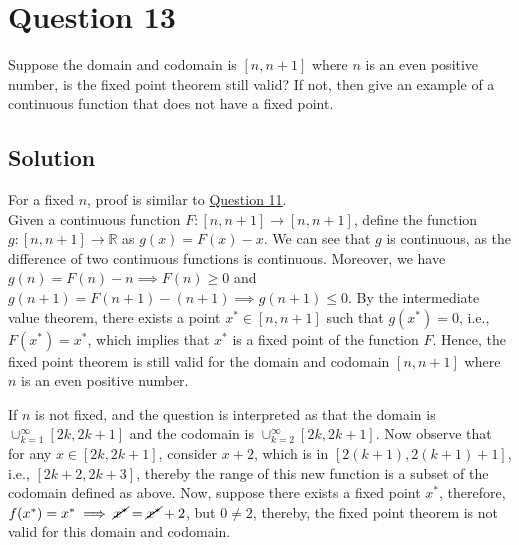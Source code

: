 \section*{Question 13}

Suppose the domain and codomain is \( [n, n+1] \) where \( n \) is an even positive number, is the fixed point theorem still valid?
If not, then give an example of a continuous function that does not have a fixed point.

\subsection*{Solution}

For a fixed \( n \), proof is similar to \hyperref[sec:q11]{Question 11}.\\
Given a continuous function \( F: [n, n+1] \rightarrow [n, n+1] \), define the function \( g: [n, n+1] \rightarrow \mathbb{R} \) as \( g(x) = F(x) - x \).
We can see that \( g \) is continuous, as the difference of two continuous functions is continuous.
Moreover, we have \( g(n) = F(n) - n \implies F(n) \geq 0 \) and \( g(n+1) = F(n+1) - (n+1) \implies g(n+1) \leq 0 \).
By the intermediate value theorem, there exists a point \( x^* \in [n, n+1] \) such that \( g(x^*) = 0 \), i.e., \( F(x^*) = x^* \), which implies that \( x^* \) is a fixed point of the function \( F \).
Hence, the fixed point theorem is still valid for the domain and codomain \( [n, n+1] \) where \( n \) is an even positive number.

\vspace*{2em}
If \( n \) is not fixed, and the question is interpreted as that the domain is \( \cup_{k=1}^{\infty} [2k, 2k+1] \) and the codomain is \( \cup_{k=2}^{\infty} [2k, 2k+1] \).
Now observe that for any \( x \in [2k, 2k+1] \), consider \( x + 2 \), which is in \( [2(k+1), 2(k+1)+1] \), i.e., \( [2k+2, 2k+3] \), thereby the range of this new function is a subset of the codomain defined as above.
Now, suppose there exists a fixed point \( x^* \), therefore, \( f(x^*) = x^* \implies \cancel{x^*} = \cancel{x^*} + 2 \), but \( 0 \neq 2 \), thereby, the fixed point theorem is not valid for this domain and codomain.

